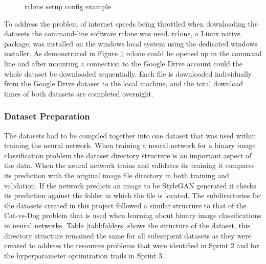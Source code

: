 \begin{figure}[H]%
\centering
{}%
\caption{rclone setup config example \citep{rclone2021}}%
\label{fig:10}%
\end{figure}

To address the problem of internet speeds being throttled when downloading the datasets the command-line software rclone was used. rclone, a Linux native package, was installed on the windows local system using the dedicated windows installer. As demonstrated in Figure \ref{fig:10} rclone could be opened up in the command line and after mounting a connection to the Google Drive account could the whole dataset be downloaded sequentially. Each file is downloaded individually from the Google Drive dataset to the local machine, and the total download times of both datasets are completed overnight.

\subsubsection{Dataset Preparation}

The datasets had to be compiled together into one dataset that was used within training the neural network. When training a neural network for a binary image classification problem the dataset directory structure is an important aspect of the data. When the neural network trains and validates its training it compares its prediction with the original image file directory in both training and validation. If the network predicts an image to be StyleGAN generated it checks its prediction against the folder in which the file is located. The subdirectories for the datasets created in this project followed a similar structure to that of the Cat-vs-Dog problem that is used when learning about binary image classifications in neural networks. Table \ref{tabl:folders} shows the structure of the dataset, this directory structure remained the same for all subsequent datasets as they were created to address the resources problems that were identified in Sprint 2 and for the hyperparameter optimization trails in Sprint 3.

